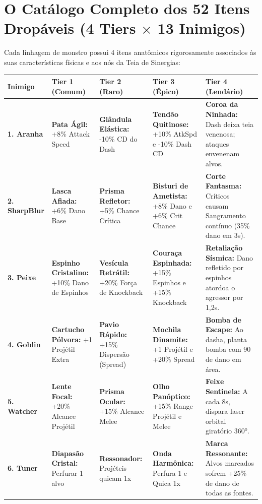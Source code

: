 \documentclass[a4paper,12pt]{report}
\begin{document}
\section{O Catálogo Completo dos 52 Itens Dropáveis (4 Tiers $\times$ 13 Inimigos)}
Cada linhagem de monstro possui 4 itens anatômicos rigorosamente associados às suas características físicas e aos nós da Teia de Sinergias:

\begin{center}
\small
\begin{tabular}{|l|p{3.2cm}|p{3.2cm}|p{3.2cm}|p{3.8cm}|}
    \hline
    \textbf{Inimigo} & \textbf{Tier 1 (Comum)} & \textbf{Tier 2 (Raro)} & \textbf{Tier 3 (Épico)} & \textbf{Tier 4 (Lendário)} \\
    \hline
    \textbf{1. Aranha} & \textbf{Pata Ágil:} +8\% Attack Speed & \textbf{Glândula Elástica:} -10\% CD do Dash & \textbf{Tendão Quitinose:} +10\% AtkSpd e -10\% Dash CD & \textbf{Coroa da Ninhada:} Dash deixa teia venenosa; ataques envenenam alvos. \\
    \hline
    \textbf{2. SharpBlur} & \textbf{Lasca Afiada:} +6\% Dano Base & \textbf{Prisma Refletor:} +5\% Chance Crítica & \textbf{Bisturi de Ametista:} +8\% Dano e +6\% Crit Chance & \textbf{Corte Fantasma:} Críticos causam Sangramento contínuo (35\% dano em 3s). \\
    \hline
    \textbf{3. Peixe} & \textbf{Espinho Cristalino:} +10\% Dano de Espinhos & \textbf{Vesícula Retrátil:} +20\% Força de Knockback & \textbf{Couraça Espinhada:} +15\% Espinhos e +15\% Knockback & \textbf{Retaliação Sísmica:} Dano refletido por espinhos atordoa o agressor por 1,2s. \\
    \hline
    \textbf{4. Goblin} & \textbf{Cartucho Pólvora:} +1 Projétil Extra & \textbf{Pavio Rápido:} +15\% Dispersão (Spread) & \textbf{Mochila Dinamite:} +1 Projétil e +20\% Spread & \textbf{Bomba de Escape:} Ao dasha, planta bomba com 90 de dano em área. \\
    \hline
    \textbf{5. Watcher} & \textbf{Lente Focal:} +20\% Alcance Projétil & \textbf{Prisma Ocular:} +15\% Alcance Melee & \textbf{Olho Panóptico:} +15\% Range Projétil e Melee & \textbf{Feixe Sentinela:} A cada 8s, dispara laser orbital giratório 360°. \\
    \hline
    \textbf{6. Tuner} & \textbf{Diapasão Cristal:} Perfurar 1 alvo & \textbf{Ressonador:} Projéteis quicam 1x & \textbf{Onda Harmônica:} Perfura 1 e Quica 1x & \textbf{Marca Ressonante:} Alvos marcados sofrem +25\% de dano de todas as fontes. \\

\end{tabular}
\end{center}
\end{document}
